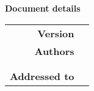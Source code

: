 \begin{center}
\textbf{Document details} \\ \vspace{0.5em}
\small
\begin{tabular}{r|l}
	\textbf{Version}	& 	\version\\
	\textbf{Authors}	& \gm\\
						& \sm\\
						& \sv\\
	\textbf{Addressed to} 			& 	\addressedto
\end{tabular}
\end{center}
\normalsize